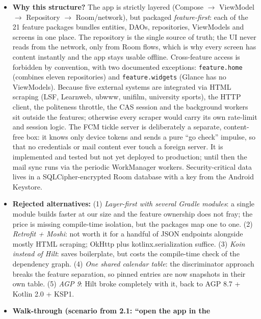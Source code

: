 \documentclass{msereport}
\begin{document}
\begin{itemize}
  \item \textbf{Why this structure?} The app is strictly layered (Compose
        $\to$ ViewModel $\to$ Repository $\to$ Room/network), but packaged
        \emph{feature-first}: each of the 21 feature packages bundles
        entities, DAOs, repositories, ViewModels and screens in one place. The
        repository is the single source of truth; the UI never reads from the
        network, only from Room flows, which is why every screen has content
        instantly and the app stays usable offline. Cross-feature access is
        forbidden by convention, with two documented exceptions:
        \texttt{feature.home} (combines eleven repositories) and
        \texttt{feature.widgets} (Glance has no ViewModels). Because five
        external systems are integrated via HTML scraping (LSF, Learnweb, ubwww,
        unifilm, university sports), the HTTP client, the politeness throttle,
        the CAS session and the background workers sit outside the features;
        otherwise every scraper would carry its own rate-limit and session
        logic. The FCM tickle server is deliberately a separate, content-free
        box: it knows only device tokens and sends a pure ``go check''
        impulse, so that no credentials or mail content ever touch a foreign
        server. It is implemented and tested but not yet deployed to production;
        until then the mail sync runs via the periodic WorkManager workers.
        Security-critical data lives in a SQLCipher-encrypted Room database with
        a key from the Android Keystore.
  \item \textbf{Rejected alternatives:} (1) \emph{Layer-first with several
        Gradle modules}: a single module builds faster at our size and the
        feature ownership does not fray; the price is missing compile-time
        isolation, but the packages map one to one. (2) \emph{Retrofit + Moshi}:
        not worth it for a handful of JSON endpoints alongside mostly HTML
        scraping; OkHttp plus kotlinx.serialization suffice. (3) \emph{Koin
        instead of Hilt}: saves boilerplate, but costs the compile-time check of
        the dependency graph. (4) \emph{One shared calendar table}: the
        discriminator approach breaks the feature separation, so pinned entries
        are now snapshots in their own table. (5) \emph{AGP 9}: Hilt broke
        completely with it, back to AGP 8.7 + Kotlin 2.0 + KSP1.
  \item \textbf{Walk-through (scenario from 2.1: ``open the app in the
}
\end{itemize}
\end{document}
